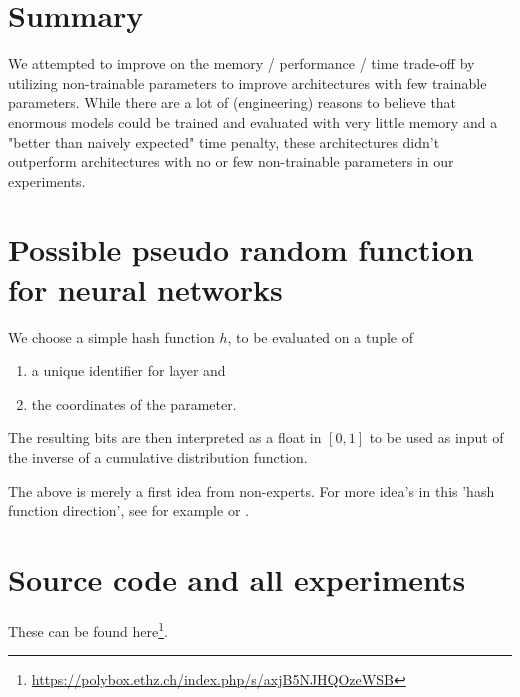 \documentclass[]{article}
\begin{document}
\begin{multicols}{2}
	\section{Summary}
	We attempted to improve on the memory / performance / time trade-off by utilizing non-trainable parameters to improve architectures with few trainable parameters. While there are a lot of (engineering) reasons to believe that enormous models could be trained and evaluated with very little memory and a "better than naively expected" time penalty, these architectures didn't outperform architectures with no or few non-trainable parameters in our experiments.
	
	\appendix
	\section{Possible pseudo random function for neural networks}
	We choose a simple hash function $h$, to be evaluated on a tuple of
	\begin{enumerate}
		\itemsep0em
		\item a unique identifier for layer and
		\item the coordinates of the parameter.
	\end{enumerate}
	The resulting bits are then interpreted as a float in $[0, 1]$ to be used as input of the inverse of a cumulative distribution function.
	
	The above is merely a first idea from non-experts. For more idea's in this 'hash function direction', see for example \cite{TAOCP364} or \cite{wiki:Hash_function}.
	
	\section{Source code and all experiments}
	These can be found here\footnote{\url{https://polybox.ethz.ch/index.php/s/axjB5NJHQOzeWSB}}.

	
	
\end{multicols}
\end{document}
